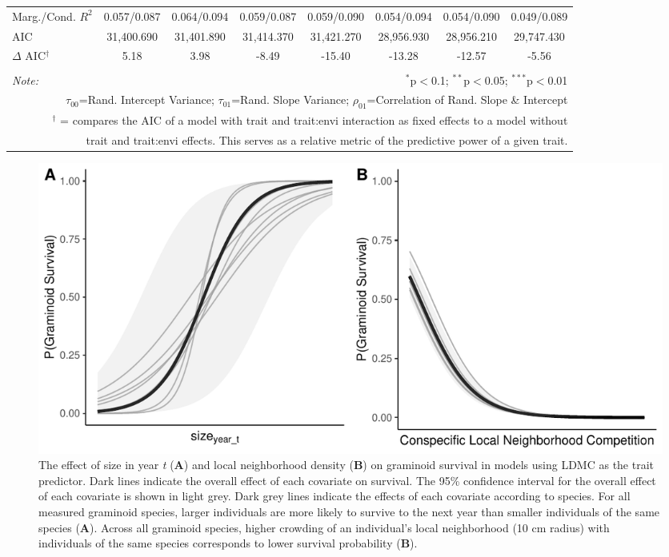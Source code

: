 \documentclass[12pt, letterpaper]{article}
\begin{document}
\begin{table}[h]
{\begin{tabular}{lccccccc}
 Marg./Cond. $R^2$ & 0.057/0.087 &	0.064/0.094&	0.059/0.087	&0.059/0.090&	0.054/0.094	& 0.054/0.090 &	0.049/0.089 \\
\rowcolor[gray]{.95} AIC & 31,400.690 & 31,401.890 & 31,414.370 & 31,421.270 & 28,956.930 & 28,956.210 & 29,747.430  \\  
\hline 
$\Delta$ AIC$^\dagger$  & 5.18 & 3.98 & -8.49 & -15.40 & -13.28 & -12.57 & -5.56 \\
\hline 
\hline \\[-1.8ex] 
\textit{Note:}  & \multicolumn{7}{r}{$^{*}$p$<$0.1; $^{**}$p$<$0.05; $^{***}$p$<$0.01} \\ 
\multicolumn{8}{r}{$\tau_{00}$=Rand. Intercept Variance; $\tau_{01}$=Rand. Slope Variance; $\rho_{01}$=Correlation of Rand. Slope \& Intercept}\\ 
\multicolumn{8}{r}{$^\dagger$ = compares the AIC of a model with trait and trait:envi interaction as fixed effects to a model without}\\
\multicolumn{8}{r}{trait and trait:envi effects. This serves as a relative metric of the predictive power of a given trait.}
\end{tabular}}
\end{table} 

\begin{figure}
    \centering
    \includegraphics[width=.9\textwidth]{images/Effects_Survival.pdf}
    \caption{The effect of size in year \textit{t} (\textbf{A}) and local neighborhood density (\textbf{B}) on graminoid survival in models using LDMC as the trait predictor. Dark lines indicate the overall effect of each covariate on survival. The 95\% confidence interval for the overall effect of each covariate is shown in light grey. Dark grey lines indicate the effects of each covariate according to species. For all measured graminoid species, larger individuals are more likely to survive to the next year than smaller individuals of the same species (\textbf{A}). Across all graminoid species, higher crowding of an individual's local neighborhood (10 cm radius) with individuals of the same species corresponds to lower survival probability (\textbf{B}). }
    \label{fig:Effects_Survival}
\end{figure}
\end{document}

